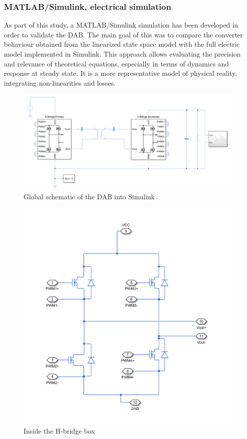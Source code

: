 \documentclass[conference]{IEEEtran}
\begin{document}
\subsubsection{MATLAB/Simulink, electrical simulation}
As part of this study, a MATLAB/Simulink simulation has been developed in order to
validate the DAB. The main goal of this was to compare the converter behaviour obtained
from the linearized state space model with the full electric model implemented in
Simulink. This approach allows evaluating the precision and relevance of theoretical
equations, especially in terms of dynamics and response at steady state. It is a more
representative model of physical reality, integrating non-linearities and losses.
\begin{figure}[htbp]
	\centerline{\includegraphics[width=\linewidth]{images/10.png}}
	\caption{Global schematic of the DAB into Simulink}
	\label{fig}
\end{figure}
\begin{figure}[htbp]
	\centerline{\includegraphics[height=0.25\textheight]{images/11.png}}
	\caption{Inside the H-bridge box}
	\label{fig}
\end{figure}
\end{document}
